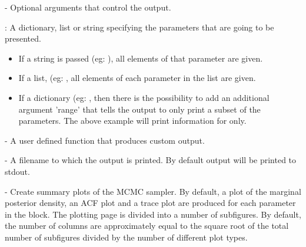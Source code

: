 \documentclass[article]{jss}
\begin{document}
  \begin{description}
  \item {} - Optional arguments that control the
    output.
    \begin{description}
    \item {}: A dictionary, list or string specifying
      the parameters that are going to be presented.
      \begin{itemize}
      \item If a string is passed (eg: ),
        all elements of that parameter are given.
      \item If a list, (eg: , all elements of each parameter in the list are
        given.
      \item If a dictionary (eg: , then there is the
        possibility to add an additional argument 'range' that tells
        the output to only print a subset of the parameters. The above
        example will print information for  only.
      \end{itemize}
    \item {} - A user defined function that produces custom
      output.
    \item {} - A filename to which the output is printed.
      By default output will be printed to stdout.
    \end{description}
   
  \item {} - Create summary plots of
    the MCMC sampler.  By default, a plot of the marginal posterior
    density, an ACF plot and a trace plot are produced for each
    parameter in the block. The plotting page is divided into a number
    of subfigures. By default, the number of columns are approximately
    equal to the square root of the total number of subfigures divided
    by the number of different plot types.
  \end{description}
\end{document}
